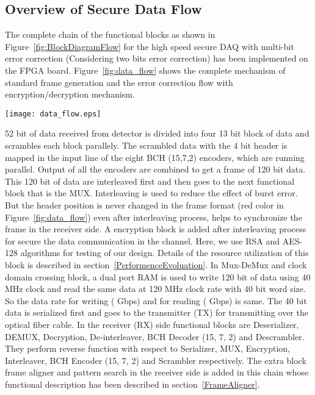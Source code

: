 \documentclass[a4paper]{jpconf}
\begin{document}
\subsection{Overview of Secure Data Flow }
 The complete chain of the functional blocks as shown in Figure~\ref{fig:BlockDiagramFlow} for the high speed secure DAQ with multi-bit error correction (Considering two bits error correction) has been implemented on the FPGA board. Figure~\ref{fig:data_flow} shows the complete mechanism of standard frame generation and the error correction flow with encryption/decryption mechanism.
\begin{figure*}[htb]
\hspace{-3 pc}
\texttt{[image: data\_flow.eps]}
\vspace{-10 pt}
\caption{Standard frame generation and Error correction flow with encryption/decryption}
\label{fig:data_flow}
\vspace{-15 pt}
\end{figure*}

52 bit of data received from detector is divided into four 13 bit block of data and scrambles each block parallely. The scrambled data with the 4 bit header is mapped in the input line of the eight BCH (15,7,2) encoders, which are running parallel.  Output of all the encoders are combined to get a frame of 120 bit data. This 120 bit of data are interleaved first and then goes to the next functional block that is the MUX. Interleaving is used to reduce the effect of burst error. But the header position is never changed in the frame format (red color in Figure~\ref{fig:data_flow}) even after interleaving process, helps to synchronize the frame in the receiver side. A encryption block is added after interleaving process for secure the data communication in the channel. Here, we use RSA and AES-128 algorithms for testing of our design. Details of the resource utilization of this block is described in section~\ref{PerformenceEvoluation}. In Mux-DeMux and clock domain crossing block, a dual port RAM is used to write 120 bit of data using 40 MHz clock and read the same data at 120 MHz clock rate with 40 bit word size. So the data rate for writing ( Gbps) and for reading ( Gbps) is same. The 40 bit data is serialized first and goes to the transmitter (TX) for transmitting over the optical fiber cable. In the receiver (RX) side functional blocks are Deserializer, DEMUX, Decryption, De-interleaver, BCH Decoder (15, 7, 2) and Descrambler. They perform reverse function with respect to Serializer, MUX, Encryption, Interleaver, BCH Encoder (15, 7, 2) and Scrambler respectively. The extra block frame aligner and pattern search in the receiver side is added in this chain whose functional description has been described in section~\ref{FrameAligner}.
\end{document}
